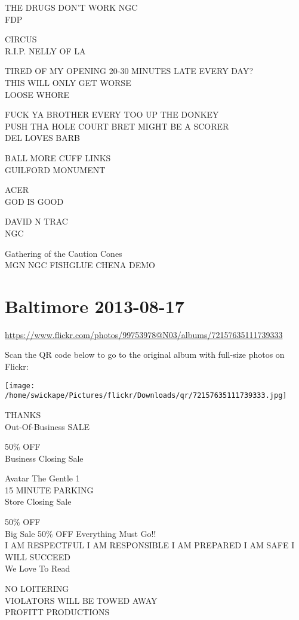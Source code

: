 \documentclass[10pt,letterpaper]{article}
\begin{document}
THE DRUGS DON'T WORK NGC\\
FDP

CIRCUS\\
R.I.P. NELLY OF LA

TIRED OF MY OPENING 20{-}30 MINUTES LATE EVERY DAY?\\
THIS WILL ONLY GET WORSE\\
LOOSE WHORE

FUCK YA BROTHER EVERY TOO UP THE DONKEY\\
PUSH THA HOLE COURT BRET MIGHT BE A SCORER\\
DEL LOVES BARB

BALL MORE CUFF LINKS\\
GUILFORD MONUMENT

ACER\\
GOD IS GOOD

DAVID N TRAC\\
NGC

Gathering of the Caution Cones\\
MGN NGC FISHGLUE CHENA DEMO


\section*{Baltimore 2013-08-17}

\url{https://www.flickr.com/photos/99753978@N03/albums/72157635111739333}

Scan the QR code below to go to the original album with full-size photos on Flickr:

\texttt{[image: /home/swickape/Pictures/flickr/Downloads/qr/72157635111739333.jpg]}


THANKS\\
Out{-}Of{-}Business SALE

50\% OFF\\
Business Closing Sale

Avatar The Gentle 1\\
15 MINUTE PARKING\\
Store Closing Sale

50\% OFF\\
Big Sale 50\% OFF Everything Must Go!!\\
I AM RESPECTFUL I AM RESPONSIBLE I AM PREPARED I AM SAFE I WILL SUCCEED\\
We Love To Read

NO LOITERING\\
VIOLATORS WILL BE TOWED AWAY\\
PROFITT PRODUCTIONS
\end{document}
